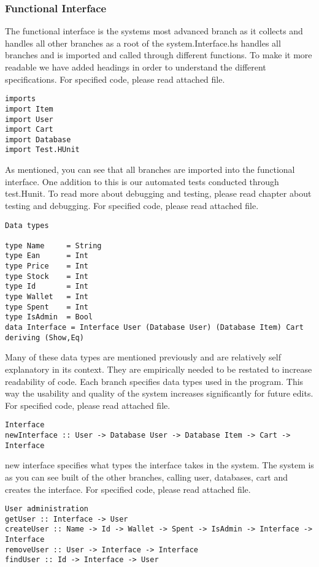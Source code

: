 \documentclass[11pt]{article}
\begin{document}
\subsubsection{Functional Interface}
The functional interface is the systems most advanced branch as it collects and handles all other branches as a root of the system.Interface.hs handles all branches and is imported and called through different functions. To make it more readable we have added headings in order to understand the different specifications. For specified code, please read attached file.
\begin{lstlisting}
imports
import Item
import User
import Cart
import Database
import Test.HUnit
\end{lstlisting}
As mentioned, you can see that all branches are imported into the functional interface. One addition to this is our automated tests conducted through test.Hunit.
To read more about debugging and testing, please read chapter about testing and debugging. For specified code, please read attached file.
\begin{lstlisting}
Data types

type Name     = String
type Ean      = Int
type Price    = Int
type Stock    = Int
type Id       = Int
type Wallet   = Int
type Spent    = Int
type IsAdmin  = Bool
data Interface = Interface User (Database User) (Database Item) Cart deriving (Show,Eq)
\end{lstlisting}
Many of these data types are mentioned previously and are relatively self explanatory in its context. They are empirically needed to be restated to increase readability of code. Each branch specifies data types used in the program. This way the usability and quality of the system increases significantly for future edits. For specified code, please read attached file.\\
\begin{lstlisting}
Interface
newInterface :: User -> Database User -> Database Item -> Cart -> Interface
\end{lstlisting}
new interface specifies what types the interface takes in the system. The system is as you can see built of the other branches, calling user, databases, cart and creates the interface. For specified code, please read attached file.
\begin{lstlisting}
User administration
getUser :: Interface -> User
createUser :: Name -> Id -> Wallet -> Spent -> IsAdmin -> Interface -> Interface
removeUser :: User -> Interface -> Interface
findUser :: Id -> Interface -> User
\end{lstlisting}
\end{document}
